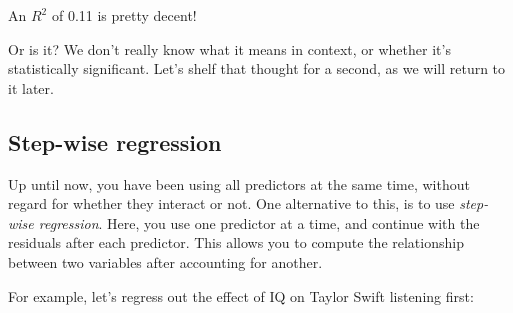 \documentclass[11pt]{article}
\begin{document}
    An \(R^{2}\) of 0.11 is pretty decent!

Or is it? We don't really know what it means in context, or whether it's
statistically significant. Let's shelf that thought for a second, as we
will return to it later.

    \subsection{Step-wise regression}\label{step-wise-regression}

Up until now, you have been using all predictors at the same time,
without regard for whether they interact or not. One alternative to
this, is to use \emph{step-wise regression}. Here, you use one predictor
at a time, and continue with the residuals after each predictor. This
allows you to compute the relationship between two variables after
accounting for another.

For example, let's regress out the effect of IQ on Taylor Swift
listening first:
\end{document}
